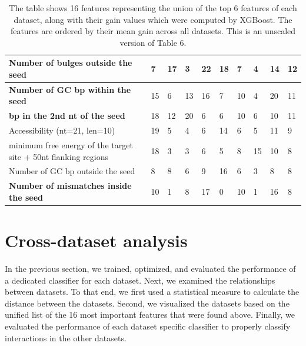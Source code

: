 \begin{table}[h!]
{\begin{tabular}{|l|l|l|l|l|l|l|l|l|l|}
Number of bulges outside the seed                          & 7            & 17           & 3            & 22          & 18          & 7           & 4           & 14          & 12            \\ \hline
\textbf{Number of GC bp within the seed}              & 15           & 6            & 13           & 16          & 7           & 10          & 4           & 20          & 11            \\ \hline
\textbf{bp in the 2nd nt of the seed}                    & 18           & 12           & 20           & 6           & 6           & 10          & 6           & 10          & 11            \\ \hline
Accessibility (nt=21, len=10)                                             & 19           & 5            & 4            & 6           & 14          & 6           & 5           & 11          & 9             \\ \hline
minimum free energy of the target site + 50nt flanking regions                     & 18           & 3            & 3            & 6           & 5           & 8           & 15          & 10          & 8             \\ \hline
Number of GC bp outside the seed                                 & 8            & 8            & 6            & 9           & 16          & 6           & 3           & 8           & 8             \\ \hline
\textbf{Number of mismatches inside the seed}    & 10           & 1            & 8            & 17          & 0           & 10          & 1           & 16          & 8             \\ \hline
\end{tabular}}
\bigbreak
\caption*{The table shows 16 features representing the union of the top 6 features of each dataset, along with their gain values which were computed by XGBoost. The features are ordered by their mean gain across all datasets. This is an unscaled version of Table 6.}
\end{table}







\section{Cross-dataset analysis}
In the previous section, we trained, optimized, and evaluated the performance of a dedicated classifier for each dataset. Next, we examined the relationships between datasets. To that end, we first used a statistical measure to calculate the distance between the datasets. Second, we visualized the datasets based on the unified list of the 16 most important features that were found above. Finally, we evaluated the performance of each dataset specific classifier to properly classify interactions in the other datasets.

